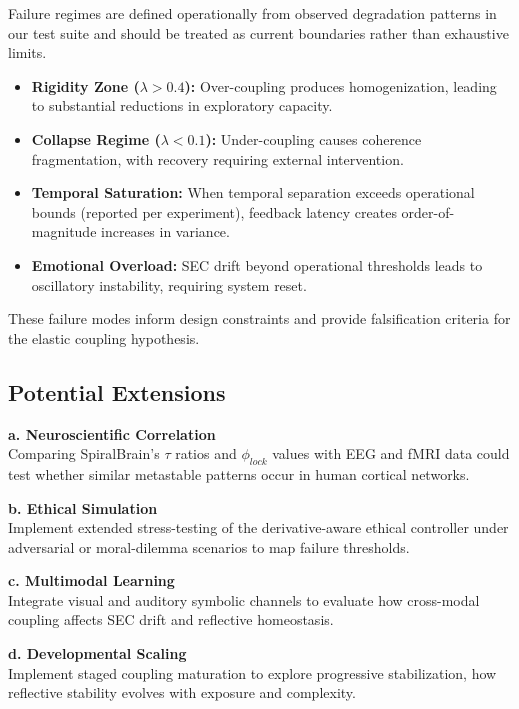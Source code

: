 \documentclass[11pt,a4paper]{article}
\begin{document}
Failure regimes are defined operationally from observed degradation patterns in our test suite and should be treated as current boundaries rather than exhaustive limits.

\begin{itemize}
\item \textbf{Rigidity Zone (\(\lambda > 0.4\)):} Over-coupling produces homogenization, leading to substantial reductions in exploratory capacity.

\item \textbf{Collapse Regime (\(\lambda < 0.1\)):} Under-coupling causes coherence fragmentation, with recovery requiring external intervention.

\item \textbf{Temporal Saturation:} When temporal separation exceeds operational bounds (reported per experiment), feedback latency creates order-of-magnitude increases in variance.
\item \textbf{Emotional Overload:} SEC drift beyond operational thresholds leads to oscillatory instability, requiring system reset.
\end{itemize}

These failure modes inform design constraints and provide falsification criteria for the elastic coupling hypothesis.

\subsection{Potential Extensions}

\textbf{a. Neuroscientific Correlation}\\
Comparing SpiralBrain's $\tau$ ratios and $\phi_{lock}$ values with EEG and fMRI data could test whether similar metastable patterns occur in human cortical networks.

\textbf{b. Ethical Simulation}\\
Implement extended stress-testing of the derivative-aware ethical controller under adversarial or moral-dilemma scenarios to map failure thresholds.

\textbf{c. Multimodal Learning}\\
Integrate visual and auditory symbolic channels to evaluate how cross-modal coupling affects SEC drift and reflective homeostasis.

\textbf{d. Developmental Scaling}\\
Implement staged coupling maturation to explore progressive stabilization, how reflective stability evolves with exposure and complexity.
\end{document}
